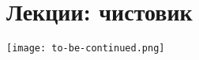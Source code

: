 \documentclass[a4paper,12pt]{book}
\begin{document}
    \pagestyle{empty}
    \titlepage
    \tableofcontents

    
    \chapter{Лекции: чистовик}
    \pagestyle{fancy}
    
    
    
    
    
    
    
    \begin{flushright}
    	\texttt{[image: to-be-continued.png]}
    \end{flushright}
\end{document}
